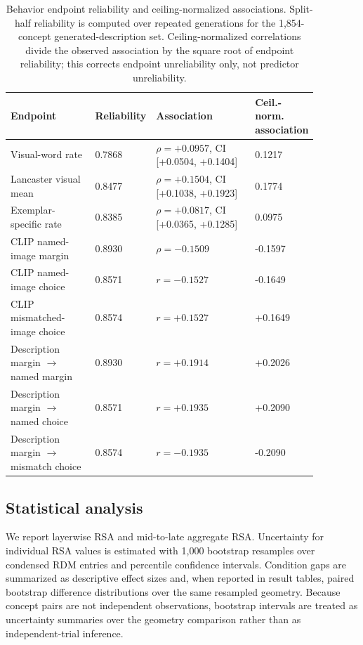 \documentclass{article}
\begin{document}
\begin{table}[!htbp]
\centering
\caption{Behavior endpoint reliability and ceiling-normalized associations. Split-half reliability is computed over repeated generations for the 1,854-concept generated-description set. Ceiling-normalized correlations divide the observed association by the square root of endpoint reliability; this corrects endpoint unreliability only, not predictor unreliability.}
\label{tab:behavior_reliability_ceiling}
\footnotesize
\begin{tabular}{@{}p{0.28\linewidth}p{0.13\linewidth}p{0.33\linewidth}p{0.13\linewidth}@{}}
\toprule
Endpoint & Reliability & Association & Ceil.-norm. association \\
\midrule
Visual-word rate & 0.7868 & \(\rho=+0.0957\), CI [+0.0504, +0.1404] & 0.1217 \\
Lancaster visual mean & 0.8477 & \(\rho=+0.1504\), CI [+0.1038, +0.1923] & 0.1774 \\
Exemplar-specific rate & 0.8385 & \(\rho=+0.0817\), CI [+0.0365, +0.1285] & 0.0975 \\
CLIP named-image margin & 0.8930 & \(\rho=-0.1509\) & -0.1597 \\
CLIP named-image choice & 0.8571 & \(r=-0.1527\) & -0.1649 \\
CLIP mismatched-image choice & 0.8574 & \(r=+0.1527\) & +0.1649 \\
Description margin \(\to\) named margin & 0.8930 & \(r=+0.1914\) & +0.2026 \\
Description margin \(\to\) named choice & 0.8571 & \(r=+0.1935\) & +0.2090 \\
Description margin \(\to\) mismatch choice & 0.8574 & \(r=-0.1935\) & -0.2090 \\
\bottomrule
\end{tabular}
\end{table}

\subsection{Statistical analysis}

We report layerwise RSA and mid-to-late aggregate RSA. Uncertainty for individual RSA values is estimated with 1,000 bootstrap resamples over condensed RDM entries and percentile confidence intervals. Condition gaps are summarized as descriptive effect sizes and, when reported in result tables, paired bootstrap difference distributions over the same resampled geometry. Because concept pairs are not independent observations, bootstrap intervals are treated as uncertainty summaries over the geometry comparison rather than as independent-trial inference.
\end{document}

